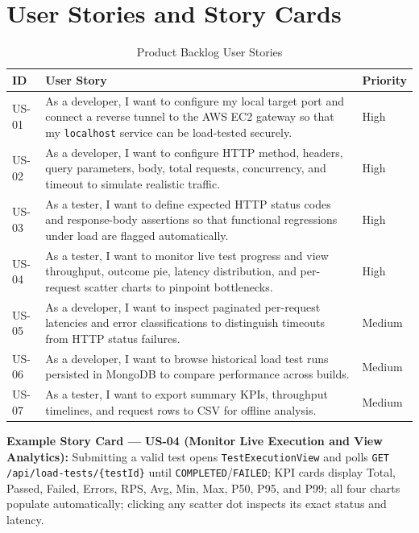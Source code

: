 \documentclass[11pt,a4paper]{report}
\begin{document}
\section{User Stories and Story Cards}

\begin{table}[!htbp]
\centering
\small
\caption{Product Backlog User Stories}
\label{tab:userstories}
\begin{tabularx}{\linewidth}{|L{1.2cm}|Y|L{1.6cm}|}
\hline
\textbf{ID} & \textbf{User Story} & \textbf{Priority} \\
\hline
US-01 & As a developer, I want to configure my local target port and connect a reverse tunnel to the AWS EC2 gateway so that my \texttt{localhost} service can be load-tested securely. & High \\
\hline
US-02 & As a developer, I want to configure HTTP method, headers, query parameters, body, total requests, concurrency, and timeout to simulate realistic traffic. & High \\
\hline
US-03 & As a tester, I want to define expected HTTP status codes and response-body assertions so that functional regressions under load are flagged automatically. & High \\
\hline
US-04 & As a tester, I want to monitor live test progress and view throughput, outcome pie, latency distribution, and per-request scatter charts to pinpoint bottlenecks. & High \\
\hline
US-05 & As a developer, I want to inspect paginated per-request latencies and error classifications to distinguish timeouts from HTTP status failures. & Medium \\
\hline
US-06 & As a developer, I want to browse historical load test runs persisted in MongoDB to compare performance across builds. & Medium \\
\hline
US-07 & As a tester, I want to export summary KPIs, throughput timelines, and request rows to CSV for offline analysis. & Medium \\
\hline
\end{tabularx}
\end{table}

\textbf{Example Story Card --- US-04 (Monitor Live Execution and View Analytics):} Submitting a valid test opens \texttt{TestExecutionView} and polls \texttt{GET /api/load-tests/\{testId\}} until \texttt{COMPLETED}/\texttt{FAILED}; KPI cards display Total, Passed, Failed, Errors, RPS, Avg, Min, Max, P50, P95, and P99; all four charts populate automatically; clicking any scatter dot inspects its exact status and latency.
\end{document}
